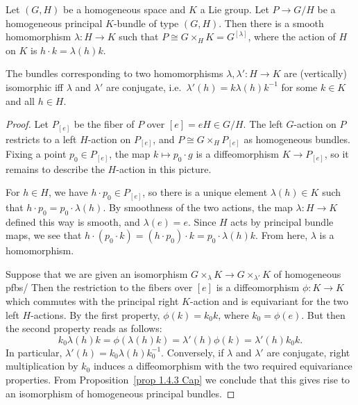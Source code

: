 \begin{prop}
    Let $(G,H)$ be a homogeneous space and $K$ a Lie group. Let $P\to G\slash H$ be a homogeneous principal $K$-bundle of type $(G,H)$. Then there is a smooth homomorphism $\lambda:H\to K$ such that $P\cong G\times_H K=G^{[\lambda]}$, where the action of $H$ on $K$ is $h\cdot k=\lambda(h)k$.

    The bundles corresponding to two homomorphisms $\lambda,\lambda':H\to K$ are (vertically) isomorphic  iff $\lambda$ and $\lambda'$ are conjugate, i.e.\ $\lambda'(h)=k\lambda(h)k^{-1}$ for some $k\in K$ and all $h\in H$.
\end{prop}
\begin{proof}
    Let $P_{[e]}$ be the fiber of $P$ over $[e]=eH\in G\slash H$. The left $G$-action on $P$ restricts to a left $H$-action on $P_{[e]}$, and $P\cong G\times_H P_{[e]}$ as homogeneous bundles. Fixing a point $p_0\in P_{[e]}$, the map $k\mapsto p_0\cdot g$ is a diffeomorphism $K\to P_{[e]}$, so it remains to describe the $H$-action in this picture.

    For $h\in H$, we have $h\cdot p_0\in P_{[e]}$, so there is a unique element $\lambda(h)\in K$ such that $h\cdot p_0=p_0\cdot \lambda(h)$. By smoothness of the two actions, the map $\lambda:H\to K$ defined this way is smooth, and $\lambda(e)=e$. Since $H$ acts by principal bundle maps, we see that $h\cdot (p_0\cdot k)=(h\cdot p_0)\cdot k=p_0\cdot \lambda(h)k$. From here, $\lambda$ is a homomorphism.

    Suppose that we are given an isomorphism $G\times_\lambda K\to G\times_{\lambda'}K$ of homogeneous \glspl{pfb}/ Then the restriction to the fibers over $[e]$ is a diffeomorphism $\phi:K\to K$ which commutes with the principal right $K$-action and is equivariant for the two left $H$-actions. By the first property, $\phi(k)=k_0k$, where $k_0=\phi(e)$. But then the second property reads as follows:
    \[k_0\lambda(h)k=\phi(\lambda(h)k)=\lambda'(h)\phi(k)=\lambda'(h)k_0k.\]
    In particular, $\lambda'(h)=k_0\lambda(h)k_0^{-1}$. Conversely, if $\lambda$ and $\lambda'$ are conjugate, right multiplication by $k_0$ induces a diffeomorphism with the two required equivariance properties. From Proposition~\ref{prop 1.4.3 Cap} we conclude that this gives rise to an isomorphism of homogeneous principal bundles. 
\end{proof}







